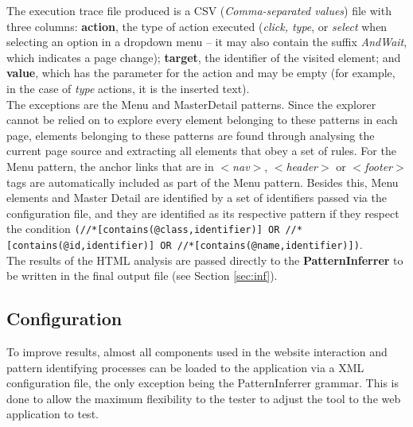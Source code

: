 \documentclass[conference]{IEEEtran}
\begin{document}
The execution trace file produced is a CSV (\textit{Comma-separated values}) file with three columns: \textbf{action}, the type of action executed (\textit{click, type}, or \textit{select} when selecting an option in a dropdown menu -- it may also contain the suffix \textit{AndWait}, which indicates a page change); \textbf{target}, the identifier of the visited element; and \textbf{value}, which has the parameter for the action and may be empty (for example, in the case of \textit{type} actions, it is the inserted text).\\

The exceptions are the Menu and MasterDetail patterns. Since the explorer cannot be relied on to explore every element belonging to these patterns in each page, elements belonging to these patterns are found through analysing the current page source and extracting all elements that obey a set of rules. For the Menu pattern, the anchor links that are in \textit{$<$nav$>$}, \textit{$<$header$>$} or \textit{$<$footer$>$} tags are automatically included as part of the Menu pattern. Besides this, Menu elements and Master Detail are identified by a set of identifiers passed via the configuration file, and they are identified as its respective pattern if they respect the condition \texttt{(//*[contains(@class,identifier)] OR //*[contains(@id,identifier)] OR //*[contains(@name,identifier)])}.\\

The results of the HTML analysis are passed directly to the \textbf{PatternInferrer} to be written in the final output file (see Section \ref{sec:inf}).\\

\subsection{Configuration}\label{sec:conf}
To improve results, almost all components used in the website interaction and pattern identifying processes can be loaded to the application via a XML configuration file, the only exception being the PatternInferrer grammar. This is done to allow the maximum flexibility to the tester to adjust the tool to the web application to test.\\
\end{document}

